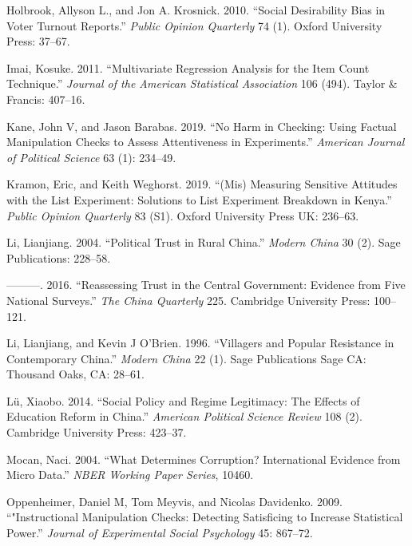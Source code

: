 \documentclass[]{article}
\begin{document}
\leavevmode\hypertarget{ref-holbrookkrosnick2010vote}{}%
Holbrook, Allyson L., and Jon A. Krosnick. 2010. ``Social Desirability
Bias in Voter Turnout Reports.'' \emph{Public Opinion Quarterly} 74 (1).
Oxford University Press: 37--67.

\leavevmode\hypertarget{ref-imai2011multivariate}{}%
Imai, Kosuke. 2011. ``Multivariate Regression Analysis for the Item
Count Technique.'' \emph{Journal of the American Statistical
Association} 106 (494). Taylor \& Francis: 407--16.

\leavevmode\hypertarget{ref-kane2019no}{}%
Kane, John V, and Jason Barabas. 2019. ``No Harm in Checking: Using
Factual Manipulation Checks to Assess Attentiveness in Experiments.''
\emph{American Journal of Political Science} 63 (1): 234--49.

\leavevmode\hypertarget{ref-kramon2019mis}{}%
Kramon, Eric, and Keith Weghorst. 2019. ``(Mis) Measuring Sensitive
Attitudes with the List Experiment: Solutions to List Experiment
Breakdown in Kenya.'' \emph{Public Opinion Quarterly} 83 (S1). Oxford
University Press UK: 236--63.

\leavevmode\hypertarget{ref-li2004political}{}%
Li, Lianjiang. 2004. ``Political Trust in Rural China.'' \emph{Modern
China} 30 (2). Sage Publications: 228--58.

\leavevmode\hypertarget{ref-li2016reassessing}{}%
---------. 2016. ``Reassessing Trust in the Central Government: Evidence
from Five National Surveys.'' \emph{The China Quarterly} 225. Cambridge
University Press: 100--121.

\leavevmode\hypertarget{ref-li1996villagers}{}%
Li, Lianjiang, and Kevin J O'Brien. 1996. ``Villagers and Popular
Resistance in Contemporary China.'' \emph{Modern China} 22 (1). Sage
Publications Sage CA: Thousand Oaks, CA: 28--61.

\leavevmode\hypertarget{ref-lu2014social}{}%
Lü, Xiaobo. 2014. ``Social Policy and Regime Legitimacy: The Effects of
Education Reform in China.'' \emph{American Political Science Review}
108 (2). Cambridge University Press: 423--37.

\leavevmode\hypertarget{ref-mocan2004what}{}%
Mocan, Naci. 2004. ``What Determines Corruption? International Evidence
from Micro Data.'' \emph{NBER Working Paper Series}, 10460.

\leavevmode\hypertarget{ref-oppenheimer2009imc}{}%
Oppenheimer, Daniel M, Tom Meyvis, and Nicolas Davidenko. 2009.
``"Instructional Manipulation Checks: Detecting Satisficing to Increase
Statistical Power.'' \emph{Journal of Experimental Social Psychology}
45: 867--72.
\end{document}
